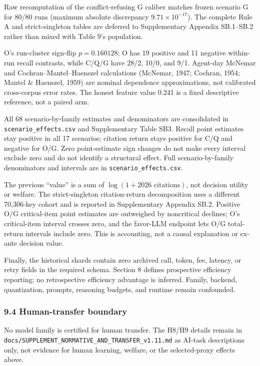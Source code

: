 \documentclass[
  11pt]{article}
\begin{document}
Raw recomputation of the conflict-refusing G caliber matches frozen
scenario G for 80/80 runs (maximum absolute discrepancy
\(9.71\times10^{-17}\)). The complete Rule A and strict-singleton tables
are deferred to Supplementary Appendix SB.1--SB.2 rather than mixed with
Table 9's population.

O's run-cluster sign-flip \(p=0.160128\); O has 19 positive and 11
negative within-run recall contrasts, while C/Q/G have 28/2, 10/0, and
9/1. Agent-day McNemar and Cochran--Mantel--Haenszel calculations
(McNemar, 1947; Cochran, 1954; Mantel \& Haenszel, 1959) are nominal
dependence approximations, not calibrated cross-corpus error rates. The
honest feature value 0.241 is a fixed descriptive reference, not a
paired arm.

All 68 scenario-by-family estimates and denominators are consolidated in
\texttt{scenario\_effects.csv} and Supplementary Table SB3. Recall point
estimates stay positive in all 17 scenarios; citation return stays
positive for C/Q and negative for O/G. Zero point-estimate sign changes
do not make every interval exclude zero and do not identify a structural
effect. Full scenario-by-family denominators and intervals are in
\texttt{scenario\_effects.csv}.

The previous ``value'' is a sum of \(\log(1+\text{2026 citations})\),
not decision utility or welfare. The strict-singleton citation-return
decomposition uses a different 70,306-key cohort and is reported in
Supplementary Appendix SB.2. Positive O/G critical-item point estimates
are outweighed by noncritical declines; O's critical-item interval
crosses zero, and the favor-LLM endpoint lets O/G total-return intervals
include zero. This is accounting, not a causal explanation or ex-ante
decision value.

Finally, the historical shards contain zero archived call, token, fee,
latency, or retry fields in the required schema. Section 8 defines
prospective efficiency reporting; no retrospective efficiency advantage
is inferred. Family, backend, quantization, prompts, reasoning budgets,
and runtime remain confounded.

\subsubsection{9.4 Human-transfer
boundary}\label{human-transfer-boundary}

No model family is certified for human transfer. The H8/H9 details
remain in \texttt{docs/SUPPLEMENT\_NORMATIVE\_AND\_TRANSFER\_v1.11.md}
as AI-task descriptions only, not evidence for human learning, welfare,
or the selected-proxy effects above.
\end{document}
